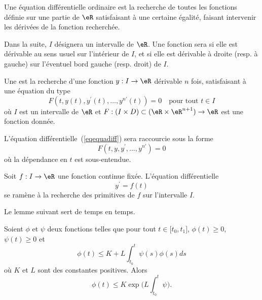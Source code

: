
Une équation différentielle ordinaire est la recherche de toutes les fonctions définie sur une partie de \( \eR\) satisfaisant à une certaine égalité, faisant intervenir les dérivées de la fonction recherchée.

Dans la suite, \( I\) désignera un intervalle de \( \eR\). Une fonction sera  si elle est dérivable au sens usuel sur l'intérieur de \( I\), et si elle est dérivable à droite (resp. à gauche) sur l'éventuel bord gauche (resp. droit) de \( I\).

\begin{definition}
	Une  est la recherche d'une fonction \( y : I \to \eR\) dérivable \( n\) fois, satisfaisant à une équation du type
	\begin{equation}\label{eqequadiff}
		F(t, y(t), y^\prime(t), \ldots, y^{n\prime}(t)) = 0 \quad \text{pour tout }t \in I
	\end{equation}
	où \( I\) est un intervalle de \( \eR\) et \begin{math}F : (I \times D) \subset (\eR\times\eR^{n+1})\to \eR\end{math} est une fonction donnée.
\end{definition}

\begin{remark}
	L'équation différentielle~(\ref{eqequadiff}) sera raccourcie sous la forme
	\begin{equation}
		F(t, y, y^\prime, \ldots, y^{n\prime}) = 0
	\end{equation}
	où la dépendance en \( t\) est sous-entendue.
\end{remark}

\begin{example}
	Soit \( f : I \to \eR\) une fonction continue fixée. L'équation différentielle
	\begin{equation}
		y^\prime = f(t)
	\end{equation}
	se ramène à la recherche des primitives de \( f\) sur l'intervalle \( I\).
\end{example}

Le lemme suivant sert de temps en temps.
\begin{lemma}\label{LemuBVozy}
	Soient \( \phi\) et \( \psi\) deux fonctions telles que pour tout \( t\in\mathopen[ t_0 , t_1 \mathclose]\), \( \phi(t)\geq 0\), \( \psi(t)\geq 0\) et
	\begin{equation}
		\phi(t)\leq K +L\int_{t_0}^t\psi(s)\phi(s)ds
	\end{equation}
	où \( K\) et \( L\) sont des constantes positives. Alors
	\begin{equation}
		\phi(t)\leq K\exp\big( L\int_{t_0}^t\psi \big).
	\end{equation}
\end{lemma}

